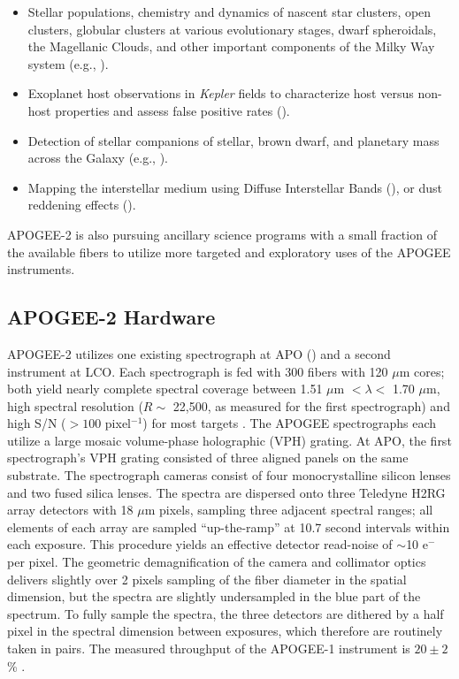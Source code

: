 \begin{itemize}
\item Stellar populations, chemistry and dynamics of nascent star
  clusters, open clusters, globular clusters at various evolutionary
  stages, dwarf spheroidals, the Magellanic Clouds, and other
  important components of the Milky Way system (e.g.,
  \citealt{frinchaboy13a, majewski13a, meszaros13a, cottaar14a,
    cottaar15a, foster15a, garciahernandez15a, meszaros15a, bovy16b}).

\item Exoplanet host observations in {\it Kepler} fields to
  characterize host versus non-host properties and assess false
  positive rates (\citealt{fleming15a}).

\item 
  Detection of stellar companions of stellar, brown dwarf, and
  planetary mass across the Galaxy (e.g., \citealt{troup16a}).

\item Mapping the interstellar medium using Diffuse Interstellar Bands
  (\citealt{zasowski15b, zasowski15a}), or dust reddening effects
  (\citealt{schultheis14a}).

\end{itemize}

APOGEE-2 is also pursuing ancillary science programs with a small
fraction of the available fibers to utilize more targeted and
exploratory uses of the APOGEE instruments.

\subsection{APOGEE-2 Hardware}

APOGEE-2 utilizes one existing spectrograph at APO
(\citealt{eisenstein11a, wilson12a, majewski15a}) and a second
instrument at LCO. Each spectrograph is fed with 300 fibers with 120
$\mu$m cores; both yield nearly complete spectral coverage between
1.51 $\mu$m $< \lambda < $ 1.70 $\mu$m, high spectral resolution
($R\sim$ 22,500, as measured for the first spectrograph) and high S/N
($> 100 $ pixel$^{-1}$) for most targets \citep{majewski15a}. The
APOGEE spectrographs each utilize a large mosaic volume-phase
holographic (VPH) grating.  At APO, the first spectrograph's VPH
grating consisted of three aligned panels on the same substrate. The
spectrograph cameras consist of four monocrystalline silicon lenses
and two fused silica lenses. The spectra are dispersed onto three
Teledyne H2RG array detectors with 18 $\mu$m pixels, sampling three
adjacent spectral ranges; all elements of each array are sampled
``up-the-ramp'' at 10.7 second intervals within each exposure.  This
procedure yields an effective detector read-noise of $\sim$10 e$^-$
per pixel.  The geometric demagnification of the camera and collimator
optics delivers slightly over 2 pixels sampling of the fiber diameter
in the spatial dimension, but the spectra are slightly undersampled in
the blue part of the spectrum. To fully sample the spectra, the three
detectors are dithered by a half pixel in the spectral dimension
between exposures, which therefore are routinely taken in pairs. The
measured throughput of the APOGEE-1 instrument is $20\pm2$\%
\citep{majewski15a}.

